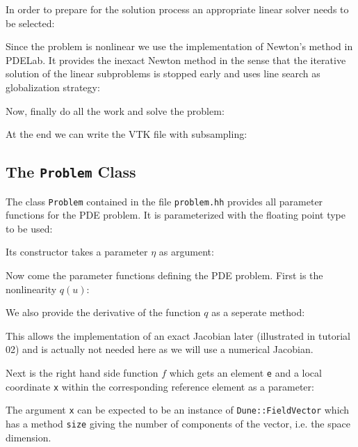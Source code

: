 \documentclass[a4paper,12pt]{article}
\begin{document}
In order to prepare for the solution process an appropriate 
linear solver needs to be selected:


Since the problem is nonlinear we use the implementation of
Newton's method in PDELab. It provides the inexact Newton method
in the sense that the iterative solution of the linear subproblems is
stopped early and uses line search as globalization strategy:


Now, finally do all the work and solve the problem:


At the end we can write the VTK file with subsampling:


\subsection{The \lstinline{Problem} Class}

The class \lstinline{Problem} contained in the file \lstinline{problem.hh}
provides all parameter functions for the PDE problem. It is parameterized
with the floating point type to be used:

Its constructor takes a parameter $\eta$ as argument:

Now come the parameter functions defining the PDE problem.
First is the nonlinearity $q(u)$:

We also provide the derivative of the function $q$ as a seperate method:

This allows the implementation of an exact Jacobian later (illustrated
in tutorial 02) and is actually not needed here as we will use a
numerical Jacobian.

Next is the right hand side function $f$ which gets 
an element \lstinline{e} and a local coordinate \lstinline{x} within
the corresponding reference element as a parameter:

The argument \lstinline{x} can be expected to be an instance
of \lstinline{Dune::FieldVector} which has a method \lstinline{size}
giving the number of components of the vector, i.e. the space dimension.
\end{document}
